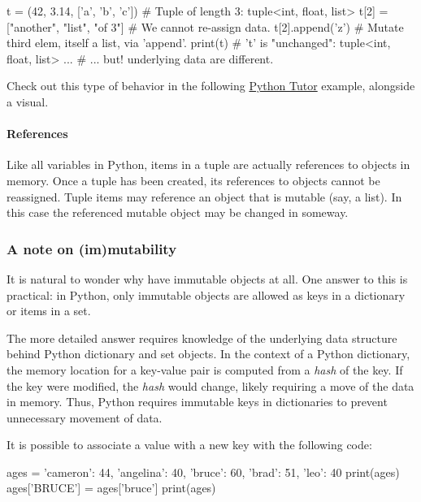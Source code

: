 \documentclass[12pt,letterpaper,twoside]{article}
\begin{document}
\begin{python}
t = (42, 3.14, ['a', 'b', 'c'])      # Tuple of length 3: tuple<int, float, list>
t[2] = ["another", "list", "of 3"]   # We cannot re-assign data.
t[2].append('z')                     # Mutate third elem, itself a list, via 'append'.
print(t)                             # 't' is "unchanged": tuple<int, float, list> ...
                                     # ... but! underlying data are different.
\end{python}

Check out this type of behavior in the following
\href{http://www.pythontutor.com/visualize.html\#code=my_tup\%20\%3D\%20(2,\%20'a\%20string',\%20\%5B1,3,8\%5D\%29\%0Amy_tup\%5B2\%5D\%5B0\%5D\%20\%3D\%20'new\%20data'\%0Aprint(my_tup\%29\%0A\&cumulative=false\&curInstr=0\&heapPrimitives=false\&mode=display\&origin=opt-frontend.js\&py=3\&rawInputLstJSON=\%5B\%5D\&textReferences=false}{Python
Tutor} example, alongside a visual.

\paragraph{References}
Like all variables in Python, items in a tuple are actually references
to objects in memory. Once a tuple has been created, its references to
objects cannot be reassigned. Tuple items may reference an object that
is mutable (say, a list). In this case the referenced mutable object may
be changed in someway.

\subsubsection{A note on (im)mutability}
It is natural to wonder why have immutable objects at all. One answer to
this is practical: in Python, only immutable objects are allowed as keys
in a dictionary or items in a set.

The more detailed answer requires knowledge of the underlying data
structure behind Python dictionary and set objects. In the context of a
Python dictionary, the memory location for a key-value pair is computed
from a \emph{hash} of the key. If the key were modified, the \emph{hash}
would change, likely requiring a move of the data in memory. Thus,
Python requires immutable keys in dictionaries to prevent unnecessary
movement of data.

It is possible to associate a value with a new key with the following
code:

\begin{python}
ages = {'cameron': 44, 'angelina': 40, 'bruce': 60, 'brad': 51, 'leo': 40}
print(ages)
ages['BRUCE'] = ages['bruce']
print(ages)
\end{python}
\end{document}
